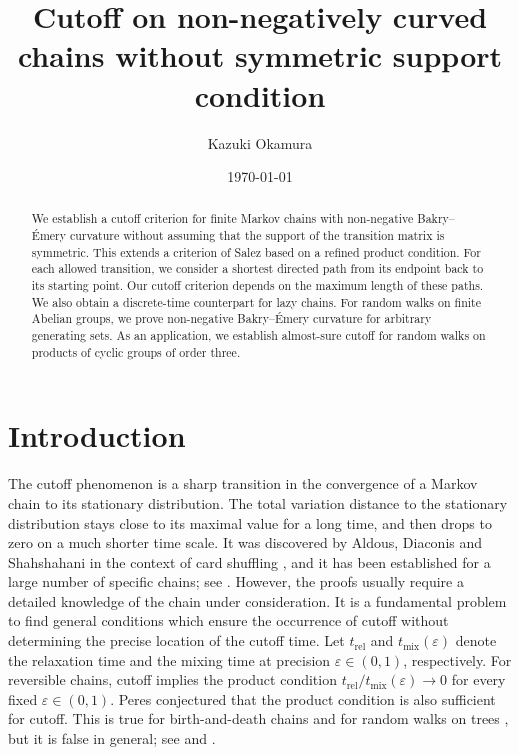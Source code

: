\documentclass[a4paper, reqno, 11pt]{amsart}
\theoremstyle{definition}
\begin{document}
\begin{abstract}
We establish a cutoff criterion for finite Markov chains with non-negative Bakry--\'Emery curvature without assuming that the support of the transition matrix is symmetric.
This extends a criterion of Salez based on a refined product condition. 
For each allowed transition, we consider a shortest directed path from its endpoint back to its starting point. 
Our cutoff criterion depends on the maximum length of these paths. 
We also obtain a discrete-time counterpart for lazy chains.
For random walks on finite Abelian groups, we prove non-negative Bakry--\'Emery curvature for arbitrary generating sets.
As an application, we establish almost-sure cutoff for random walks on products of cyclic groups of order three.
\end{abstract}



\title[]{Cutoff on non-negatively curved chains without symmetric support condition}
\author{Kazuki Okamura}
\date{\today}
\address{Department of Mathematics, Faculty of Science, Shizuoka University, 836, Ohya, Suruga-ku, Shizuoka, 422-8529, JAPAN.}

\maketitle

\section{Introduction}

The cutoff phenomenon is a sharp transition in the convergence of a Markov chain to its stationary distribution. 
The total variation distance to the stationary distribution stays close to its maximal value for a long time, and then drops to zero on a much shorter time scale.
It was discovered by Aldous, Diaconis and Shahshahani in the context of card shuffling \cite{DS1981, Aldous1983, AD1986},
and it has been established for a large number of specific chains; see \cite{Diaconis1996, SaloffCoste2004, LP2017}.
However, the proofs usually require a detailed knowledge of the chain under consideration.
It is a fundamental problem to find general conditions which ensure the occurrence of cutoff without determining the precise location of the cutoff time.
Let $t_{\mathrm{rel}}$ and $t_{\mathrm{mix}}(\varepsilon)$ denote the relaxation time and the mixing time at precision $\varepsilon \in (0,1)$, respectively.
For reversible chains, cutoff implies the product condition $t_{\mathrm{rel}} / t_{\mathrm{mix}}(\varepsilon) \to 0$ for every fixed $\varepsilon \in (0,1)$. 
Peres \cite{Peres2004} conjectured that the product condition is also sufficient for cutoff.
This is true for birth-and-death chains \cite{DLP2010} and for random walks on trees \cite{BHP2017}, but it is false in general; see \cite[Section 6]{CSC2008} and \cite[Chapter 18]{LP2017}.
\end{document}
